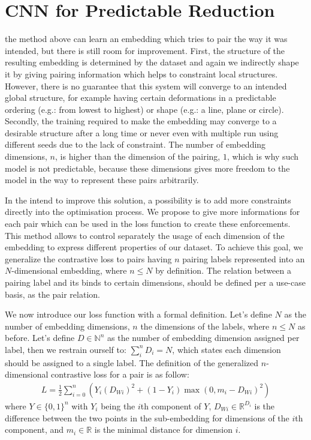 \documentclass[a4paper,12pt]{report}
\newcommand{\N}{\mathbb{N}}
\newcommand{\R}{\mathbb{R}}
\newcommand{\eg}{e.g.}
\begin{document}
\section{CNN for Predictable Reduction}
the method above can learn an embedding which tries to pair the way it was intended, but there is still room for improvement.
First, the structure of the resulting embedding is determined by the dataset and again we indirectly shape it by giving pairing information which helps to constraint local structures.
However, there is no guarantee that this system will converge to an intended global structure, for example having certain deformations in a predictable ordering (\eg: from lowest to highest) or shape (\eg: a line, plane or circle).
Secondly, the training required to make the embedding may converge to a desirable structure after a long time or never even with multiple run using different seeds due to the lack of constraint.
The number of embedding dimensions, $n$, is higher than the dimension of the pairing, $1$, which is why such model is not predictable, because these dimensions gives more freedom to the model in the way to represent these pairs arbitrarily.

In the intend to improve this solution, a possibility is to add more constraints directly into the optimisation process.
We propose to give more informations for each pair which can be used in the loss function to create these enforcements.
This method allows to control separately the usage of each dimension of the embedding to express different properties of our dataset.
To achieve this goal, we generalize the contrastive loss to pairs having $n$ pairing labels represented into an $N$-dimensional embedding, where $n \leq N$ by definition.
The relation between a pairing label and its binds to certain dimensions, should be defined per a use-case basis, as the pair relation.

We now introduce our loss function with a formal definition.
Let's define $N$ as the number of embedding dimensions, $n$ the dimensions of the labels, where $n \leq N$ as before.
Let's define $D \in \N^n$ as the number of embedding dimension assigned per label, then we restrain ourself to: $\sum_i^n D_i = N$, which states each dimension should be assigned to a single label.
The definition of the generalized $n$-dimensional contrastive loss for a pair is as follow:
\begin{eqnarray}
    L = \frac{1}{2} \sum_{i=0}^n \left( Y_i (D_{Wi})^2 + (1-Y_i) \max(0, m_i - D_{Wi})^2 \right)
\end{eqnarray}
where $Y \in \{0,1\}^n$ with $Y_i$ being the $i$th component of $Y$, $D_{Wi} \in \R^{D_i}$ is the difference between the two points in the sub-embedding for dimensions of the $i$th component, and $m_i \in \R$ is the minimal distance for dimension $i$.
\end{document}
